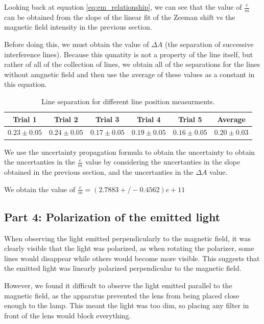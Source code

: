 Looking back at equation \ref{eq:em_relationship}, we can see that the value of $\frac{e}{m}$ can be obtained from the slope of the linear fit of the Zeeman shift vs the magnetic field intensity in the previous section.

Before doing this, we must obtain the value of $\Delta A$ (the separation of successive interference lines). Because this qunatity is not a property
of the line itself, but rather of all of the collection of lines, we obtain all of the separations for the lines without amgnetic field
and then use the average of these values as a constant in this equation.

\def\lineUncertainty{0.05}
\begin{table}[h]
    \centering
    \begin{tabular}{|c|c|c|c|c|c|}
        \hline
        Trial 1                     & Trial 2                     & Trial 3                     & Trial 4                     & Trial 5                     & Average         \\
        \hline
        $0.23 \pm \lineUncertainty$ & $0.24 \pm \lineUncertainty$ & $0.17 \pm \lineUncertainty$ & $0.19 \pm \lineUncertainty$ & $0.16 \pm \lineUncertainty$ & $0.20 \pm 0.03$ \\
        \hline
    \end{tabular}
    \caption{Line separation for different line position measurments.}
    \label{your-label}
\end{table}



We use the uncertainty propagation formula to obtain the uncertainty to obtain the uncertanties in the $\frac{e}{m}$ value
by considering the uncertanties in the slope obtained in the previous section, and the uncertanties in the $\Delta A$ value.


We obtain the value of $\frac{e}{m} = (2.7883+/-0.4562)e+11$

\subsection{Part 4: Polarization of the emitted light}
When observing the light emitted perpendicularly to the magnetic field, it was clearly visible that the light was polarized, as when rotating the polarizer, some lines would disappear while others would become more visible. This suggests that the emitted light was linearly polarized perpendicular to the magnetic field.

However, we found it difficult to observe the light emitted parallel to the magnetic field, as the apparatus prevented the lens from being placed close enough to the lamp. This meant the light was too dim, so placing any filter in front of the lens would block everything.